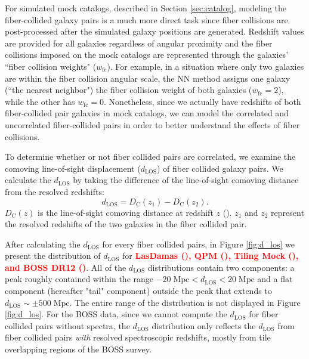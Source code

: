 \documentclass{emulateapj}
\newcommand{\todo}[1]{{\bf \textcolor{red}{ #1}}}
\begin{document}
For simulated mock catalogs, described in Section \ref{sec:catalog}, modeling the fiber-collided galaxy pairs is a much more direct task since fiber collisions are post-processed after the simulated galaxy positions are generated. Redshift values are provided for all galaxies regardless of angular proximity and the fiber collisions imposed on the mock catalogs are represented through the galaxies' ``fiber collision weights" ($w_\mathrm{fc}$). For example, in a situation where only two galaxies are within the fiber collision angular scale, the NN method assigns one galaxy (``the nearest neighbor") the fiber collision weight of both galaxies ($w_{\mathrm{fc}} = 2$), while the other has $w_\mathrm{fc} = 0$. Nonetheless, since we actually have redshifts of both fiber-collided pair galaxies in mock catalogs, we can model the correlated and uncorrelated fiber-collided pairs in order to better understand the effects of fiber collisions. 

To determine whether or not fiber collided pairs are correlated, we examine the comoving line-of-sight displacement ($d_{\mathrm{LOS}}$) of fiber collided galaxy pairs. We calculate the $d_{\mathrm{LOS}}$ by taking the difference of the line-of-sight comoving distance from the resolved redshifts: 
\begin{equation}
d_{\mathrm{LOS}} = D_{\mathrm{C}} (z_1) - D_{\mathrm{C}} (z_2). 
\end{equation}
$D_{\mathrm{C}}(z)$ is the line-of-sight comoving distance at redshift $z$ (\citealt{Hogg:1999aa}). $z_1$ and $z_2$ represent the resolved redshifts of the two galaxies in the fiber collided pair.

After calculating the $d_{\mathrm{LOS}}$ for every fiber collided pairs, in Figure \ref{fig:d_los} we present the distribution of $d_{\mathrm{LOS}}$ for \todo{LasDamas (\ldgcolor), QPM (\qpmcolor), Tiling Mock (\tmcolor), and BOSS DR12 (\cmasscolor)}. All of the $d_{\mathrm{LOS}}$ distributions contain two components: a peak roughly contained within the range $-20\;\mathrm{Mpc} < d_{\mathrm{LOS}} < 20\;\mathrm{Mpc}$ and a flat component (hereafter "tail" component) outside the peak that extends to $d_{\mathrm{LOS}} \sim \pm 500 \;\mathrm{Mpc}$. The entire range of the distribution is not displayed in Figure \ref{fig:d_los}. For the BOSS data, since we cannot compute the $d_\mathrm{LOS}$ for fiber collided pairs without spectra, the $d_\mathrm{LOS}$ distribution only reflects the $d_\mathrm{LOS}$ from fiber collided pairs {\em with} resolved spectroscopic redshifts, mostly from tile overlapping regions of the BOSS survey.
\end{document}
